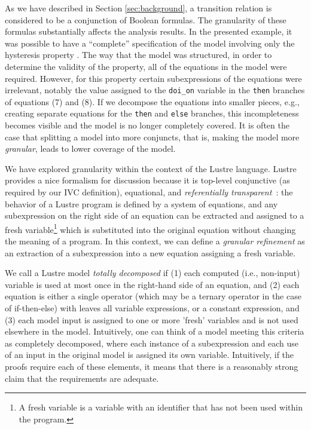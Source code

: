As we have described in Section \ref{sec:background}, a transition relation is considered
to be a conjunction of Boolean formulas. The granularity of these formulas substantially affects the analysis results.  In the presented example, it was possible to have a ``complete'' specification of the model involving only the hysteresis property \hystp.  The way that the model was structured, in order to determine the validity of the property, all of the equations in the model were required.  However, for this property certain subexpressions of the equations were irrelevant, notably the value assigned to the \texttt{doi\_on} variable in the \texttt{then} branches of equations (7) and (8).  If we decompose the equations into smaller pieces, e.g., creating separate equations for the \texttt{then} and \texttt{else} branches, this incompleteness becomes visible and the model is no longer completely covered.  It is often the case that splitting a model into more conjuncts, that is, making the model more {\em granular}, leads to lower coverage of the model.



%
We have explored granularity within the context of the Lustre language.  Lustre provides a nice formalism for discussion because it is top-level conjunctive (as required by our IVC definition), equational, and {\em referentially transparent}~\cite{Halbwachs91:lustre}: the behavior of a Lustre program is defined by a system of equations, and any subexpression on the right side of an equation can be extracted and assigned to a fresh variable\footnote{A fresh variable is a variable with an identifier that has not been used within the program.} which is substituted into the original equation without changing the meaning of a program.  In this context, we can define a {\em granular refinement} as an extraction of a subexpression into a new equation assigning a fresh variable.

We call a Lustre model {\em totally decomposed} if (1) each computed (i.e., non-input) variable is used at most once in the right-hand side of an equation, and (2) each equation is either a single operator (which may be a ternary operator in the case of if-then-else) with leaves all variable expressions, or a constant expression, and (3) each model input is assigned to one or more 'fresh' variables and is not used elsewhere in the model.  Intuitively, one can think of a model meeting this criteria as completely decomposed, where each instance of a subexpression and each use of an input in the original model is assigned its own variable.  Intuitively, if the proofs require each of these elements, it means that there is a reasonably strong claim that the requirements are adequate.

